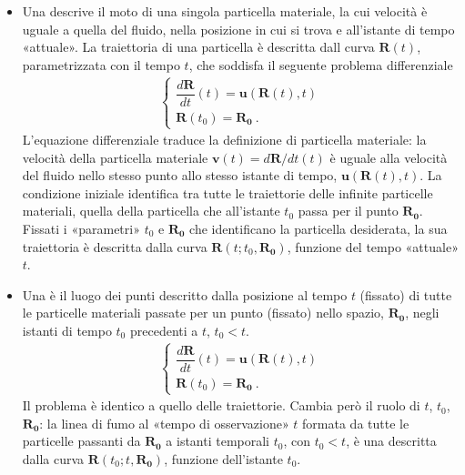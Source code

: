 \documentclass[letterpaper,10pt,italian]{jupyterBook}
\begin{document}
\begin{itemize}
\item {} 
\sphinxAtStartPar
Una  descrive il moto di una singola particella
materiale, la cui velocità è uguale a quella del fluido, nella
posizione in cui si trova e all’istante di tempo «attuale». La
traiettoria di una particella è descritta dall curva \(\mathbf{R}(t)\),
parametrizzata con il tempo \(t\), che soddisfa il seguente problema
differenziale
\begin{equation*}
\begin{split}\begin{cases}
     \dfrac{d\mathbf{R}}{dt}(t) = \mathbf{u}(\mathbf{R}(t),t) \\
     \mathbf{R}(t_0) = \mathbf{R_0} \ .
    \end{cases}\end{split}
\end{equation*}
\sphinxAtStartPar
L’equazione differenziale traduce la definizione di
particella materiale: la velocità della particella materiale
\(\mathbf{v}(t) = d \mathbf{R} / dt (t)\) è uguale alla velocità del fluido
nello stesso punto allo stesso istante di tempo,
\(\mathbf{u}(\mathbf{R}(t),t)\). La condizione iniziale identifica tra tutte
le traiettorie delle infinite particelle materiali, quella della
particella che all’istante \(t_0\) passa per il punto \(\mathbf{R_0}\).
Fissati i «parametri» \(t_0\) e \(\mathbf{R_0}\) che identificano la
particella desiderata, la sua traiettoria è descritta dalla curva
\(\mathbf{R}(t;t_0,\mathbf{R_0})\), funzione del tempo «attuale» \(t\).

\item {} 
\sphinxAtStartPar
Una  è il luogo dei punti descritto dalla posizione
al tempo \(t\) (fissato) di tutte le particelle materiali passate per
un punto (fissato) nello spazio, \(\mathbf{R_0}\), negli istanti di tempo
\(t_0\) precedenti a \(t\), \(t_0 < t\).
\begin{equation*}
\begin{split}\begin{cases}
     \dfrac{d\mathbf{R}}{dt}(t) = \mathbf{u}(\mathbf{R}(t),t) \\
     \mathbf{R}(t_0) = \mathbf{R_0} \ .
    \end{cases}\end{split}
\end{equation*}
\sphinxAtStartPar
Il problema è identico a quello delle traiettorie.
Cambia però il ruolo di \(t\), \(t_0\), \(\mathbf{R_0}\): la linea di fumo al
«tempo di osservazione» \(t\) formata da tutte le particelle passanti
da \(\mathbf{R_0}\) a istanti temporali \(t_0\), con \(t_0<t\), è una
descritta dalla curva \(\mathbf{R}(t_0;t,\mathbf{R_0})\), funzione
dell’istante \(t_0\).


\end{itemize}
\end{document}
